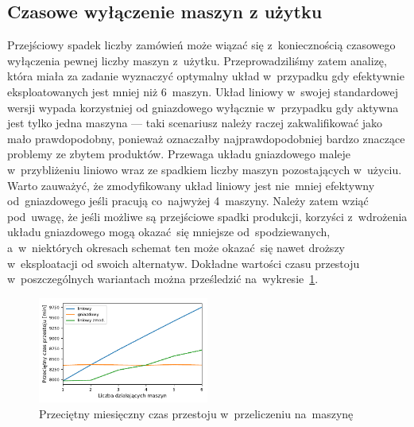 \documentclass[12pt, a4paper, oneside]{mwart} %
\begin{document}
\subsection{Czasowe wyłączenie maszyn z użytku}
Przejściowy spadek liczby zamówień może wiązać się z~koniecznością czasowego wyłączenia pewnej liczby maszyn z~użytku. Przeprowadziliśmy zatem analizę, która miała za zadanie wyznaczyć optymalny układ w~przypadku gdy efektywnie eksploatowanych jest mniej niż 6~maszyn. Układ liniowy w~swojej standardowej wersji wypada korzystniej od gniazdowego wyłącznie w~przypadku gdy aktywna jest tylko jedna maszyna --- taki scenariusz należy raczej zakwalifikować jako mało prawdopodobny, ponieważ oznaczałby najprawdopodobniej bardzo znaczące problemy ze zbytem produktów. Przewaga układu gniazdowego maleje w~przybliżeniu liniowo wraz ze spadkiem liczby maszyn pozostających w~użyciu. Warto zauważyć, że zmodyfikowany układ liniowy jest nie~mniej efektywny od~gniazdowego jeśli pracują co~najwyżej 4~maszyny. Należy zatem wziąć pod~uwagę, że jeśli możliwe są przejściowe spadki produkcji, korzyści z~wdrożenia układu gniazdowego mogą okazać~się mniejsze od~spodziewanych, a~w~niektórych okresach schemat ten może okazać~się nawet droższy w~eksploatacji od swoich alternatyw. Dokładne wartości czasu przestoju w~poszczególnych wariantach można prześledzić na~wykresie~\ref{wyk_recesja}.
\begin{figure}
\centering
\caption{Przeciętny miesięczny czas przestoju w~przeliczeniu na~maszynę}
\label{wyk_recesja}
\includegraphics[width = 0.5\textwidth]{wykresy/recesja.pdf}
\end{figure}
\end{document}

